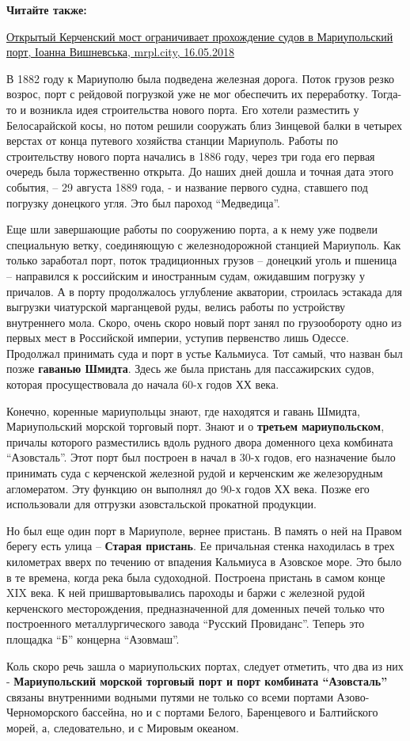 \textbf{Читайте также:} 

\href{https://mrpl.city/news/view/otkrytyj-kerchenskij-most-ogranichivaet-prohozhdenie-sudov-v-mariupolskij-port}{%
Открытый Керченский мост ограничивает прохождение судов в Мариупольский порт, Іоанна Вишневська, mrpl.city, 16.05.2018}

В 1882 году к Мариуполю была подведена железная дорога. Поток грузов резко
возрос, порт с рейдовой погрузкой уже не мог обеспечить их переработку.
Тогда-то и возникла идея строительства нового порта. Его хотели разместить у
Белосарайской косы, но потом решили сооружать близ Зинцевой балки в четырех
верстах от конца путевого хозяйства станции Мариуполь. Работы по строительству
нового порта начались в 1886 году, через три года его первая очередь была
торжественно открыта. До наших дней дошла и точная дата этого события, – 29
августа 1889 года, - и название первого судна, ставшего под погрузку донецкого
угля. Это был пароход \enquote{Медведица}.

Еще шли завершающие работы по сооружению порта, а к нему уже подвели
специальную ветку, соединяющую с железнодорожной станцией Мариуполь. Как только
заработал порт, поток традиционных грузов – донецкий уголь и пшеница –
направился к российским и иностранным судам, ожидавшим погрузку у причалов. А в
порту продолжалось углубление акватории, строилась эстакада для выгрузки
чиатурской марганцевой руды, велись работы по устройству внутреннего мола.
Скоро, очень скоро новый порт занял по грузообороту одно из первых мест в
Российской империи, уступив первенство лишь Одессе. Продолжал принимать суда и
порт в устье Кальмиуса. Тот самый, что назван был позже \textbf{гаванью Шмидта}. Здесь
же была пристань для пассажирских судов, которая просуществовала до начала 60-х
годов ХХ века.

Конечно, коренные мариупольцы знают, где находятся и гавань Шмидта,
Мариупольский морской торговый порт. Знают и о \textbf{третьем мариупольском}, причалы
которого разместились вдоль рудного двора доменного цеха комбината \enquote{Азовсталь}.
Этот порт был построен в начал в 30-х годов, его назначение было принимать суда
с керченской железной рудой и керченским же железорудным агломератом. Эту
функцию он выполнял до 90-х годов ХХ века. Позже его использовали для отгрузки
азовстальской прокатной продукции.

Но был еще один порт в Мариуполе, вернее пристань. В память о ней на Правом
берегу есть улица – \textbf{Старая пристань}. Ее причальная стенка находилась в трех
километрах вверх по течению от впадения Кальмиуса в Азовское море. Это было в
те времена, когда река была судоходной. Построена пристань в самом конце XIX
века. К ней пришвартовывались пароходы и баржи с железной рудой керченского
месторождения, предназначенной для доменных печей только что построенного
металлургического завода \enquote{Русский Провиданс}. Теперь это площадка \enquote{Б} концерна
\enquote{Азовмаш}. 

Коль скоро речь зашла о мариупольских портах, следует отметить, что два из них
- \textbf{Мариупольский морской торговый порт и порт комбината \enquote{Азовсталь}} связаны
внутренними водными путями не только со всеми портами Азово-Черноморского
бассейна, но и с портами Белого, Баренцевого и Балтийского морей, а,
следовательно, и с Мировым океаном.
